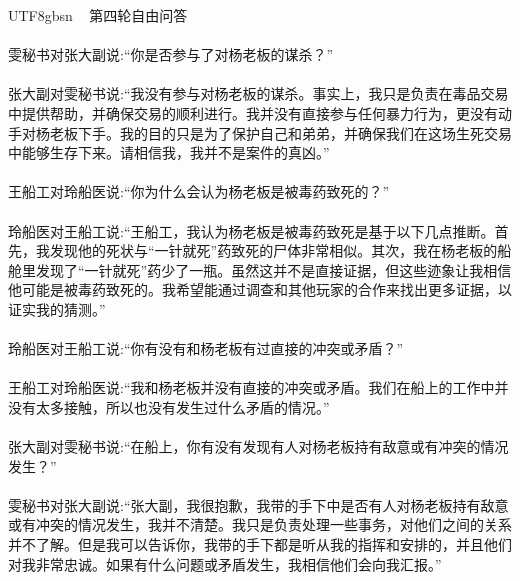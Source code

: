 \documentclass[11pt]{article}
\begin{document}
{\begin{CJK}{UTF8}{gbsn}
\ \raisedrule[.5ex]{1pt} 第四轮自由问答 \raisedrule[.5ex]{1pt} \ \\\\
雯秘书对张大副说:``你是否参与了对杨老板的谋杀？''\\ \\
张大副对雯秘书说:``我没有参与对杨老板的谋杀。事实上，我只是负责在毒品交易中提供帮助，并确保交易的顺利进行。我并没有直接参与任何暴力行为，更没有动手对杨老板下手。我的目的只是为了保护自己和弟弟，并确保我们在这场生死交易中能够生存下来。请相信我，我并不是案件的真凶。''\\ \\
王船工对玲船医说:``你为什么会认为杨老板是被毒药致死的？''\\ \\
玲船医对王船工说:``王船工，我认为杨老板是被毒药致死是基于以下几点推断。首先，我发现他的死状与“一针就死”药致死的尸体非常相似。其次，我在杨老板的船舱里发现了“一针就死”药少了一瓶。虽然这并不是直接证据，但这些迹象让我相信他可能是被毒药致死的。我希望能通过调查和其他玩家的合作来找出更多证据，以证实我的猜测。''\\ \\
玲船医对王船工说:``你有没有和杨老板有过直接的冲突或矛盾？''\\ \\
王船工对玲船医说:``我和杨老板并没有直接的冲突或矛盾。我们在船上的工作中并没有太多接触，所以也没有发生过什么矛盾的情况。''\\ \\
张大副对雯秘书说:``在船上，你有没有发现有人对杨老板持有敌意或有冲突的情况发生？''\\ \\
雯秘书对张大副说:``张大副，我很抱歉，我带的手下中是否有人对杨老板持有敌意或有冲突的情况发生，我并不清楚。我只是负责处理一些事务，对他们之间的关系并不了解。但是我可以告诉你，我带的手下都是听从我的指挥和安排的，并且他们对我非常忠诚。如果有什么问题或矛盾发生，我相信他们会向我汇报。''\\ \\


\end{CJK}}
\end{document}
